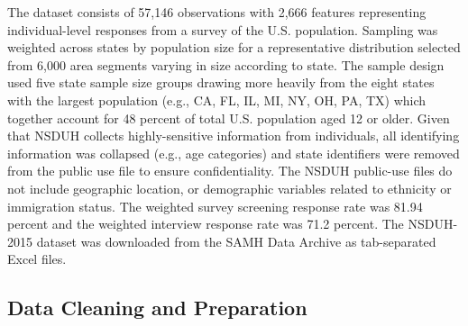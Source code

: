 \documentclass[sigconf]{acmart}
\begin{document}
The dataset consists of 57,146 observations with 2,666 features representing 
individual-level responses from a survey of the U.S. population. Sampling was 
weighted across states by population size for a representative distribution 
selected from 6,000 area segments varying in size according to state. The 
sample design used five state sample size groups drawing more heavily from 
the eight states with the largest population (e.g., CA, FL, IL, MI, NY, OH, 
PA, TX) which together account for 48 percent of total U.S. population aged 
12 or older. Given that NSDUH collects highly-sensitive information from 
individuals, all identifying information was collapsed (e.g., age categories)
and state identifiers were removed from the public use file to ensure 
confidentiality. The NSDUH public-use files do not include geographic location, 
or demographic variables related to ethnicity or immigration status. The 
weighted survey screening response rate was 81.94 percent and the weighted
interview response rate was 71.2 percent. The NSDUH-2015 dataset was 
downloaded from the SAMH Data Archive as tab-separated Excel files.


\subsection{Data Cleaning and Preparation }
\end{document}
